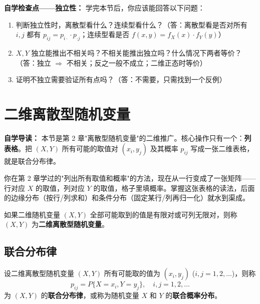 ﻿\documentclass[lang=cn,11pt]{elegantbook}
\begin{document}
\begin{note}
\textbf{自学检查点——独立性：} 学完本节后，你应该能回答以下问题：
\begin{enumerate}
    \item 判断独立性时，离散型看什么？连续型看什么？（答：离散型看是否对所有 $i,j$ 都有 $p_{ij}=p_{i\cdot}\cdot p_{\cdot j}$；连续型看是否 $f(x,y)=f_X(x)\cdot f_Y(y)$）
    \item $X,Y$ 独立能推出不相关吗？不相关能推出独立吗？什么情况下两者等价？（答：独立 $\Rightarrow$ 不相关；反之一般不成立；二维正态时等价）
    \item 证明不独立需要验证所有点吗？（答：不需要，只需找到一个反例）
\end{enumerate}
\end{note}

\section{二维离散型随机变量}

\begin{note}
\textbf{自学导读：} 本节是第 2 章"离散型随机变量"的二维推广。核心操作只有一个：\textbf{列表格}。把 $(X,Y)$ 所有可能的取值对 $(x_i, y_j)$ 及其概率 $p_{ij}$ 写成一张二维表格，就是联合分布律。

你在第 2 章学过的"列出所有取值和概率"的方法，现在从一行变成了一张矩阵——行对应 $X$ 的取值，列对应 $Y$ 的取值，格子里填概率。掌握这张表格的读法，后面的边缘分布（按行/列求和）和条件分布（固定某行/列再归一化）就水到渠成。
\end{note}

\begin{definition}[二维离散型随机变量] \label{def:2d-discrete}
如果二维随机变量 $(X,Y)$ 全部可能取到的值是有限对或可列无限对，则称 $(X,Y)$ 为\textbf{二维离散型随机变量}。
\end{definition}

\subsection{联合分布律}

\begin{definition}[联合分布律]  \label{def:joint-pm}
设二维离散型随机变量 $(X,Y)$ 所有可能取的值为 $(x_i, y_j)$ ($i,j = 1,2,\dots$)，则称
\[
p_{ij} = P\{X = x_i, Y = y_j\}, \quad i,j = 1,2,\dots
\]
为 $(X,Y)$ 的\textbf{联合分布律}，或称为随机变量 $X$ 和 $Y$ 的\textbf{联合概率分布}。
\end{definition}
\end{document}
